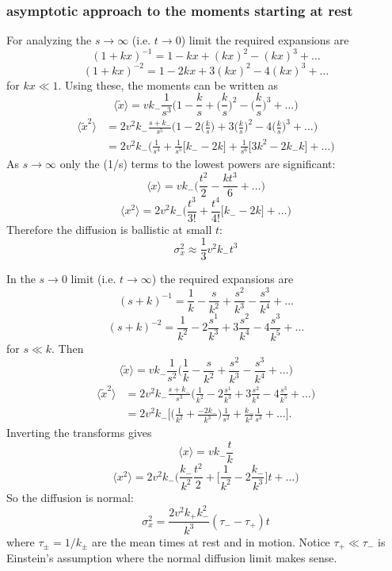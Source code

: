 \documentclass[11pt]{article}
\newcommand\be{\begin{equation}} %
\newcommand\ee{\end{equation}}   %
\newcommand\bra{\langle}
\newcommand\ket{\rangle}
\begin{document}
\subsubsection{asymptotic approach to the moments starting at rest}
For analyzing the $s\rightarrow \infty$ (i.e. $t\rightarrow 0$) limit the required expansions are
\be (1+kx)^{-1} = 1 - kx + (kx)^2 - (kx)^3 + \dots \ee
\be (1+kx)^{-2} = 1 - 2kx + 3 (kx)^2 - 4 (kx)^3 + \dots \ee
for $kx \ll 1$.
Using these, the moments can be written as
\be \bra \tilde{x} \ket = vk_- \frac{1}{s^3}\Big(1-\frac{k}{s} + \big(\frac{k}{s}\big)^2 - \big(\frac{k}{s}\big)^3 + \dots \Big) \ee
\begin{align} \bra \tilde{x}^2 \ket &= 2v^2 k_- \frac{s+k_-}{s^5}\Big(1-2\big(\frac{k}{s}\big) + 3\big(\frac{k}{s}\big)^2 - 4\big(\frac{k}{s}\big)^3 + \dots \Big) \\
&= 2 v^2 k_- \Big(\frac{1}{s^4}+ \frac{1}{s^5}\big[k_--2k\big] + \frac{1}{s^6}\big[3k^2-2k_-k\big] + \dots\Big)
\end{align}
As $s\rightarrow \infty$ only the (1/s) terms to the lowest powers are significant:
\be \bra x \ket= vk_-\Big( \frac{t^2}{2} -\frac{kt^3}{6} + \dots\Big) \ee
\be \bra x^2 \ket = 2v^2k_- \Big(\frac{t^3}{3!} + \frac{t^4}{4!}\big[k_--2k\big] + \dots \Big) \ee
Therefore the diffusion is ballistic at small $t$: 
\be \sigma_x^2 \approx \frac{1}{3}v^2 k_- t^3 \ee


In the $s\rightarrow 0$ limit (i.e. $t \rightarrow \infty$) the required expansions are
\be (s+k)^{-1}  = \frac{1}{k} - \frac{s}{k^2} + \frac{s^2}{k^3} - \frac{s^3}{k^4} + \dots \ee
\be (s+k)^{-2} = \frac{1}{k^2} - 2\frac{s^1}{k^3} + 3 \frac{s^2}{k^4} - 4 \frac{s^3}{k^5} + \dots \ee
for $s\ll k$. Then
\be \bra \tilde{x} \ket = v k_- \frac{1}{s^2}\Big(\frac{1}{k} - \frac{s}{k^2} + \frac{s^2}{k^3} - \frac{s^3}{k^4} + \dots \Big) \ee
\begin{align} \bra \tilde{x}^2 \ket &= 2v^2 k_- \frac{s+k_-}{s^3}\Big(\frac{1}{k^2} - 2\frac{s^1}{k^3} + 3 \frac{s^2}{k^4} - 4 \frac{s^3}{k^5} + \dots \Big) \\
&= 2v^2 k_-\Big[ \Big(\frac{1}{k^2} + \frac{-2k_-}{k^3} \Big)\frac{1}{s^2} + \frac{k_-}{k^2} \frac{1}{s^3} + \dots \Big].
\end{align}
Inverting the transforms gives
\be \bra x \ket = v k_- \frac{t}{k}\ee
\be \bra x^2 \ket = 2v^2 k_- \Big(\frac{k_-}{k^2} \frac{t^2}{2} + \Big[\frac{1}{k^2} - 2\frac{k_-}{k^3}\Big]t + \dots \Big)\ee
So the diffusion is normal:
\be \sigma_x^2 = \frac{2v^2k_+k_-^2}{k^3}(\tau_- - \tau_+ )t\ee
where $\tau_\pm = 1/k_\pm$ are the mean times at rest and in motion.
Notice $\tau_+ \ll \tau_-$ is Einstein's assumption where the normal diffusion limit makes sense.
\end{document}
